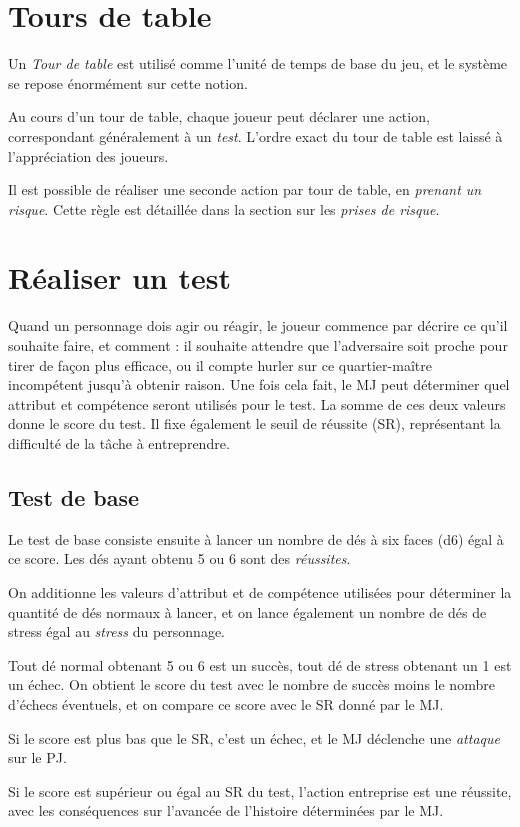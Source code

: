 \documentclass{report}
\begin{document}
\begin{multicols}{2}
\section{Tours de table}
Un \emph{Tour de table} est utilisé comme l'unité de temps de base du jeu, et le système se repose énormément sur cette notion.

Au cours d'un tour de table, chaque joueur peut déclarer une action, correspondant généralement à un \emph{test}. L'ordre exact du tour de table est laissé à l'appréciation des joueurs.

Il est possible de réaliser une seconde action par tour de table, en \emph{prenant un risque}. Cette règle est détaillée dans la section sur les \emph{prises de risque}.
\section{Réaliser un test}
Quand un personnage dois agir ou réagir, le joueur commence par décrire ce qu'il souhaite faire, et comment : il souhaite attendre que l'adversaire soit proche pour tirer de façon plus efficace, ou il compte hurler sur ce quartier-maître incompétent jusqu'à obtenir raison. Une fois cela fait, le MJ peut déterminer quel attribut et compétence seront utilisés pour le test. La somme de ces deux valeurs donne le score du test. Il fixe également le seuil de réussite (SR), représentant la difficulté de la tâche à entreprendre.
\subsection{Test de base}
Le test de base consiste ensuite à lancer un  nombre de dés à six faces (d6) égal à ce score. Les dés ayant obtenu 5 ou 6 sont des \emph{réussites}.

On additionne les valeurs d'attribut et de compétence utilisées pour déterminer la quantité de dés normaux à lancer, et on lance également un nombre de dés de stress égal au \emph{stress} du personnage.

Tout dé normal obtenant 5 ou 6 est un succès, tout dé de stress obtenant un 1 est un échec. On obtient le score du test avec le nombre de succès moins le nombre d'échecs éventuels, et on compare ce score avec le SR donné par le MJ.

Si le score est plus bas que le SR, c'est un échec, et le MJ déclenche une \emph{attaque} sur le PJ.

Si le score est supérieur ou égal au SR du test, l'action entreprise est une réussite, avec les conséquences sur l'avancée de l'histoire déterminées par le MJ. 


\end{multicols}
\end{document}
